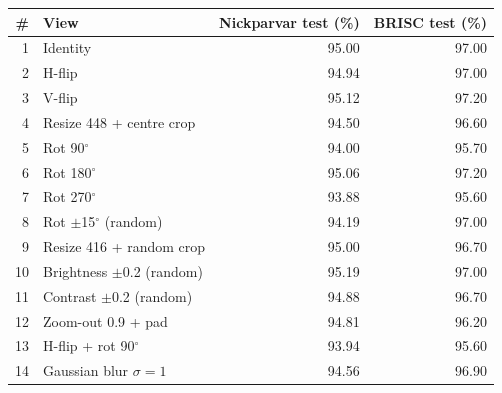 \begin{tabular}{r l r r }
\toprule
\textbf{\#} & \textbf{View} & \textbf{Nickparvar test (\%)} & \textbf{BRISC test (\%)} \\
\midrule
1 & Identity & 95.00 & 97.00 \\
2 & H-flip & 94.94 & 97.00 \\
3 & V-flip & 95.12 & 97.20 \\
4 & Resize 448 + centre crop & 94.50 & 96.60 \\
5 & Rot 90$^\circ$ & 94.00 & 95.70 \\
6 & Rot 180$^\circ$ & 95.06 & 97.20 \\
7 & Rot 270$^\circ$ & 93.88 & 95.60 \\
8 & Rot $\pm$15$^\circ$ (random) & 94.19 & 97.00 \\
9 & Resize 416 + random crop & 95.00 & 96.70 \\
10 & Brightness $\pm$0.2 (random) & 95.19 & 97.00 \\
11 & Contrast $\pm$0.2 (random) & 94.88 & 96.70 \\
12 & Zoom-out 0.9 + pad & 94.81 & 96.20 \\
13 & H-flip + rot 90$^\circ$ & 93.94 & 95.60 \\
14 & Gaussian blur $\sigma=1$ & 94.56 & 96.90 \\
\bottomrule
\end{tabular}
